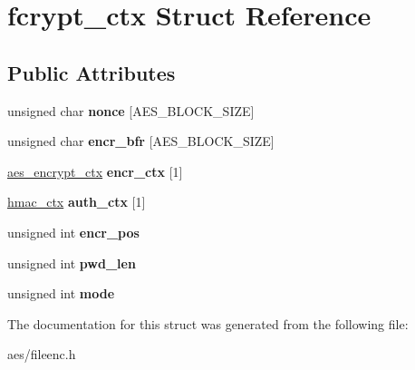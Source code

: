 \hypertarget{structfcrypt__ctx}{}\section{fcrypt\+\_\+ctx Struct Reference}
\label{structfcrypt__ctx}
\subsection*{Public Attributes}
\begin{DoxyCompactItemize}
\item 
unsigned char {\bfseries nonce} \mbox{[}A\+E\+S\+\_\+\+B\+L\+O\+C\+K\+\_\+\+S\+I\+ZE\mbox{]}\hypertarget{structfcrypt__ctx_a7cfe8ecb20e768a42e32d1b831a0f21c}{}\label{structfcrypt__ctx_a7cfe8ecb20e768a42e32d1b831a0f21c}

\item 
unsigned char {\bfseries encr\+\_\+bfr} \mbox{[}A\+E\+S\+\_\+\+B\+L\+O\+C\+K\+\_\+\+S\+I\+ZE\mbox{]}\hypertarget{structfcrypt__ctx_a05eaa87c38a9441d68de46ff6db041ff}{}\label{structfcrypt__ctx_a05eaa87c38a9441d68de46ff6db041ff}

\item 
\hyperlink{structaes__encrypt__ctx}{aes\+\_\+encrypt\+\_\+ctx} {\bfseries encr\+\_\+ctx} \mbox{[}1\mbox{]}\hypertarget{structfcrypt__ctx_ada3a0d9320b74fef4bc24905efd68872}{}\label{structfcrypt__ctx_ada3a0d9320b74fef4bc24905efd68872}

\item 
\hyperlink{structhmac__ctx}{hmac\+\_\+ctx} {\bfseries auth\+\_\+ctx} \mbox{[}1\mbox{]}\hypertarget{structfcrypt__ctx_a8bd82c02c5b4f98b2c1712e13f97f159}{}\label{structfcrypt__ctx_a8bd82c02c5b4f98b2c1712e13f97f159}

\item 
unsigned int {\bfseries encr\+\_\+pos}\hypertarget{structfcrypt__ctx_a1134ca184df30c09b8f05faf860e4add}{}\label{structfcrypt__ctx_a1134ca184df30c09b8f05faf860e4add}

\item 
unsigned int {\bfseries pwd\+\_\+len}\hypertarget{structfcrypt__ctx_ad52ff923dbc89f97b5baea3669b54880}{}\label{structfcrypt__ctx_ad52ff923dbc89f97b5baea3669b54880}

\item 
unsigned int {\bfseries mode}\hypertarget{structfcrypt__ctx_ada8b31090eecd6758fdd7cdac25b4d35}{}\label{structfcrypt__ctx_ada8b31090eecd6758fdd7cdac25b4d35}

\end{DoxyCompactItemize}


The documentation for this struct was generated from the following file\+:\begin{DoxyCompactItemize}
\item 
aes/fileenc.\+h\end{DoxyCompactItemize}
